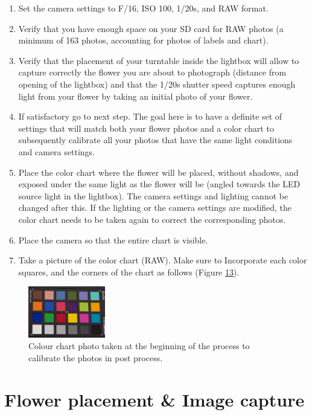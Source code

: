 \documentclass[
]{book}
\begin{document}
\begin{enumerate}
\def\labelenumi{\arabic{enumi}.}
\item
  Set the camera settings to F/16, ISO 100, 1/20s, and RAW format.
\item
  Verify that you have enough space on your SD card for RAW photos (a
  minimum of 163 photos, accounting for photos of labels and chart).
\item
  Verify that the placement of your turntable inside the lightbox will
  allow to capture correctly the flower you are about to photograph
  (distance from opening of the lightbox) and that the 1/20s shutter
  speed captures enough light from your flower by taking an initial
  photo of your flower.
\item
  If satisfactory go to next step. The goal here is to have a definite
  set of settings that will match both your flower photos and a color
  chart to subsequently calibrate all your photos that have the same
  light conditions and camera settings.
\item
  Place the color chart where the flower will be placed, without
  shadows, and exposed under the same light as the flower will be
  (angled towards the LED source light in the lightbox). The camera
  settings and lighting cannot be changed after this. If the lighting
  or the camera settings are modified, the color chart needs to be
  taken again to correct the corresponding photos.
\item
  Place the camera so that the entire chart is visible.
\item
  Take a picture of the color chart (RAW). Make sure to Incorporate
  each color squares, and the corners of the chart as follows (Figure
  \protect\hyperlink{colorchart}{13}).
\end{enumerate}

\begin{figure}
\hypertarget{colorchart}{%
\centering
\includegraphics[width=0.3\textwidth,height=\textheight]{Figures/chart_example.png}
\caption{Colour chart photo taken at the beginning of the process to calibrate
the photos in post process.}\label{colorchart}
}
\end{figure}

\hypertarget{flower-placement-image-capture}{%
\section{Flower placement \& Image capture}\label{flower-placement-image-capture}}
\end{document}
